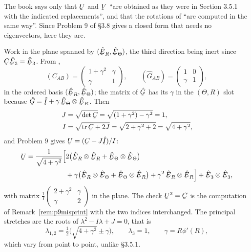 The book says only that $\bU$ and $\bV$ ``are obtained as they were in
Section 3.5.1 with the indicated replacements'', and that the rotations of
 ``are computed in the same way''. Since Problem 9 of \S3.8 gives
a closed form that needs no eigenvectors, here they are.

Work in the plane spanned by $(\hER,\hETh)$, the third direction being
inert since $\bC\hbE_{3}=\hbE_{3}$. From ,
\[
   (C_{AB})=\begin{pmatrix}1+\gamma^{2}&\gamma\\ \gamma&1\end{pmatrix},
   \qquad
   (\hat G_{AB})=\begin{pmatrix}1&0\\ \gamma&1\end{pmatrix},
\]
in the ordered basis $(\hER,\hETh)$; the matrix of $\hat\bG$ has its
$\gamma$ in the $(\Theta,R)$ slot because $\hat\bG=\hI+\gamma\,
\hETh\otimes\hER$. Then
\[
\begin{aligned}
   J&=\sqrt{\det\bC}=\sqrt{(1+\gamma^{2})-\gamma^{2}}=1,\\
   I&=\sqrt{\tr\bC+2J}=\sqrt{2+\gamma^{2}+2}=\sqrt{4+\gamma^{2}},
\end{aligned}
\]
and Problem 9 gives $\bU=(\bC+J\hI)/I$:
\[
\begin{aligned}
   \bU=\frac{1}{\sqrt{4+\gamma^{2}}}\Big[
     &2\big(\hER\otimes\hER+\hETh\otimes\hETh\big)\\
     &+\gamma\big(\hER\otimes\hETh+\hETh\otimes\hER\big)
      +\gamma^{2}\,\hER\otimes\hER\Big]
     +\hbE_{3}\otimes\hbE_{3},
\end{aligned}
\]
with matrix $\tfrac{1}{I}\left(\begin{smallmatrix}2+\gamma^{2}&\gamma\\
\gamma&2\end{smallmatrix}\right)$ in the plane. The check
$\bU^{2}=\bC$ is the computation of Remark~\ref{rem:p9misprint} with the
two indices interchanged. The principal stretches are the roots of
$\lambda^{2}-I\lambda+J=0$, that is
\[
   \lambda_{1,2}=\tfrac12\Big(\sqrt{4+\gamma^{2}}\pm\gamma\Big),
   \qquad \lambda_{3}=1,\qquad \gamma=R\phi'(R),
\]
which vary from point to point, unlike \S3.5.1.

